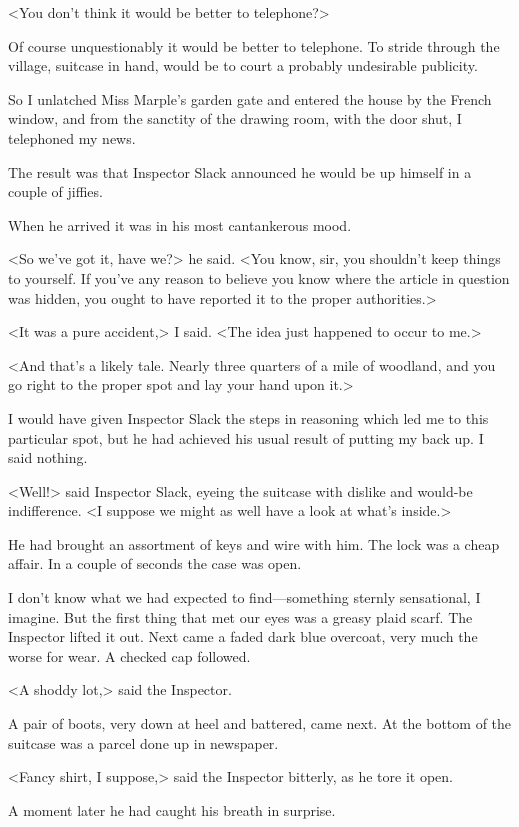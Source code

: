 <You don't think it would be better to telephone?>

Of course unquestionably it would be better to telephone. To stride through the village, suitcase in hand, would be to court a probably undesirable publicity.

So I unlatched Miss Marple's garden gate and entered the house by the French window, and from the sanctity of the drawing room, with the door shut, I telephoned my news.

The result was that Inspector Slack announced he would be up himself in a couple of jiffies.

When he arrived it was in his most cantankerous mood.

<So we've got it, have we?> he said. <You know, sir, you shouldn't keep things to yourself. If you've any reason to believe you know where the article in question was hidden, you ought to have reported it to the proper authorities.>

<It was a pure accident,> I said. <The idea just happened to occur to me.>

<And that's a likely tale. Nearly three quarters of a mile of woodland, and you go right to the proper spot and lay your hand upon it.>

I would have given Inspector Slack the steps in reasoning which led me to this particular spot, but he had achieved his usual result of putting my back up. I said nothing.

<Well!> said Inspector Slack, eyeing the suitcase with dislike and would-be indifference. <I suppose we might as well have a look at what's inside.>

He had brought an assortment of keys and wire with him. The lock was a cheap affair. In a couple of seconds the case was open.

I don't know what we had expected to find—something sternly sensational, I imagine. But the first thing that met our eyes was a greasy plaid scarf. The Inspector lifted it out. Next came a faded dark blue overcoat, very much the worse for wear. A checked cap followed.

<A shoddy lot,> said the Inspector.

A pair of boots, very down at heel and battered, came next. At the bottom of the suitcase was a parcel done up in newspaper.

<Fancy shirt, I suppose,> said the Inspector bitterly, as he tore it open.

A moment later he had caught his breath in surprise.

